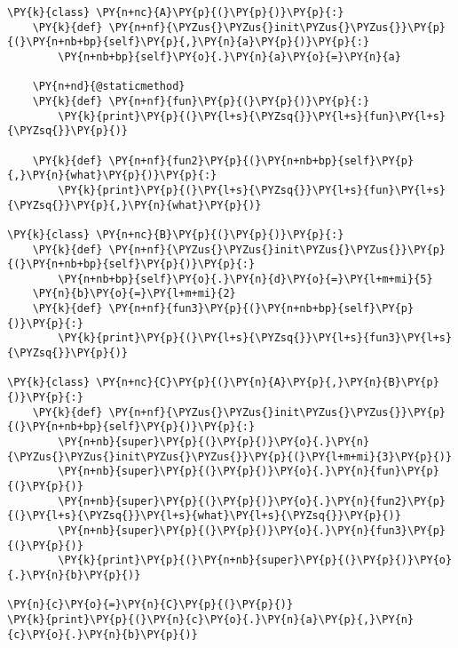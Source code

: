 \begin{Verbatim}[commandchars=\\\{\}]
\PY{k}{class} \PY{n+nc}{A}\PY{p}{(}\PY{p}{)}\PY{p}{:}
    \PY{k}{def} \PY{n+nf}{\PYZus{}\PYZus{}init\PYZus{}\PYZus{}}\PY{p}{(}\PY{n+nb+bp}{self}\PY{p}{,}\PY{n}{a}\PY{p}{)}\PY{p}{:}
        \PY{n+nb+bp}{self}\PY{o}{.}\PY{n}{a}\PY{o}{=}\PY{n}{a}

    \PY{n+nd}{@staticmethod}
    \PY{k}{def} \PY{n+nf}{fun}\PY{p}{(}\PY{p}{)}\PY{p}{:}
        \PY{k}{print}\PY{p}{(}\PY{l+s}{\PYZsq{}}\PY{l+s}{fun}\PY{l+s}{\PYZsq{}}\PY{p}{)}

    \PY{k}{def} \PY{n+nf}{fun2}\PY{p}{(}\PY{n+nb+bp}{self}\PY{p}{,}\PY{n}{what}\PY{p}{)}\PY{p}{:}
        \PY{k}{print}\PY{p}{(}\PY{l+s}{\PYZsq{}}\PY{l+s}{fun}\PY{l+s}{\PYZsq{}}\PY{p}{,}\PY{n}{what}\PY{p}{)}

\PY{k}{class} \PY{n+nc}{B}\PY{p}{(}\PY{p}{)}\PY{p}{:}
    \PY{k}{def} \PY{n+nf}{\PYZus{}\PYZus{}init\PYZus{}\PYZus{}}\PY{p}{(}\PY{n+nb+bp}{self}\PY{p}{)}\PY{p}{:}
        \PY{n+nb+bp}{self}\PY{o}{.}\PY{n}{d}\PY{o}{=}\PY{l+m+mi}{5}
    \PY{n}{b}\PY{o}{=}\PY{l+m+mi}{2}
    \PY{k}{def} \PY{n+nf}{fun3}\PY{p}{(}\PY{n+nb+bp}{self}\PY{p}{)}\PY{p}{:}
        \PY{k}{print}\PY{p}{(}\PY{l+s}{\PYZsq{}}\PY{l+s}{fun3}\PY{l+s}{\PYZsq{}}\PY{p}{)}

\PY{k}{class} \PY{n+nc}{C}\PY{p}{(}\PY{n}{A}\PY{p}{,}\PY{n}{B}\PY{p}{)}\PY{p}{:}
    \PY{k}{def} \PY{n+nf}{\PYZus{}\PYZus{}init\PYZus{}\PYZus{}}\PY{p}{(}\PY{n+nb+bp}{self}\PY{p}{)}\PY{p}{:}
        \PY{n+nb}{super}\PY{p}{(}\PY{p}{)}\PY{o}{.}\PY{n}{\PYZus{}\PYZus{}init\PYZus{}\PYZus{}}\PY{p}{(}\PY{l+m+mi}{3}\PY{p}{)}
        \PY{n+nb}{super}\PY{p}{(}\PY{p}{)}\PY{o}{.}\PY{n}{fun}\PY{p}{(}\PY{p}{)}
        \PY{n+nb}{super}\PY{p}{(}\PY{p}{)}\PY{o}{.}\PY{n}{fun2}\PY{p}{(}\PY{l+s}{\PYZsq{}}\PY{l+s}{what}\PY{l+s}{\PYZsq{}}\PY{p}{)}
        \PY{n+nb}{super}\PY{p}{(}\PY{p}{)}\PY{o}{.}\PY{n}{fun3}\PY{p}{(}\PY{p}{)}
        \PY{k}{print}\PY{p}{(}\PY{n+nb}{super}\PY{p}{(}\PY{p}{)}\PY{o}{.}\PY{n}{b}\PY{p}{)}

\PY{n}{c}\PY{o}{=}\PY{n}{C}\PY{p}{(}\PY{p}{)}
\PY{k}{print}\PY{p}{(}\PY{n}{c}\PY{o}{.}\PY{n}{a}\PY{p}{,}\PY{n}{c}\PY{o}{.}\PY{n}{b}\PY{p}{)}
\end{Verbatim}
